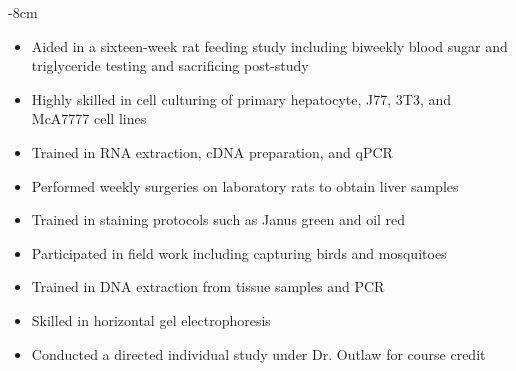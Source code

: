 \documentclass[10pt,a4paper]{altacv}
\begin{document}

\begin{adjustwidth}{}{-8cm}
\makecvheader
\end{adjustwidth}







\begin{itemize}
\item Aided in a sixteen-week rat feeding study including biweekly blood sugar and triglyceride testing and sacrificing post-study 
\item Highly skilled in cell culturing of primary hepatocyte, J77, 3T3, and McA7777 cell lines
\item Trained in RNA extraction, cDNA preparation, and qPCR
\item Performed weekly surgeries on laboratory rats to obtain liver samples
\item Trained in staining protocols such as Janus green and oil red
\end{itemize}

\divider

\begin{itemize}
\item Participated in field work including capturing birds and mosquitoes  
\item Trained in DNA extraction from tissue samples and PCR
\item Skilled in horizontal gel electrophoresis
\item Conducted a directed individual study under Dr. Outlaw for course credit
\end{itemize}
\end{document}
